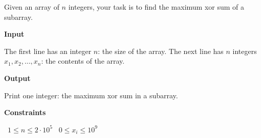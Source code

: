 Given an array of $n$ integers, your task is to find the maximum xor sum of a subarray.

\vspace{0.3cm}\noindent\textbf{Input}

The first line has an integer $n$: the size of the array.
The next line has $n$ integers $x_1,x_2,\dots,x_n$: the contents of the array.

\vspace{0.3cm}\noindent\textbf{Output}

Print one integer: the maximum xor sum in a subarray.

\vspace{0.3cm}\noindent\textbf{Constraints}

\textbullet\ $1 \le n \le 2 \cdot 10^5$
\textbullet\ $0 \le x_i \le 10^9$